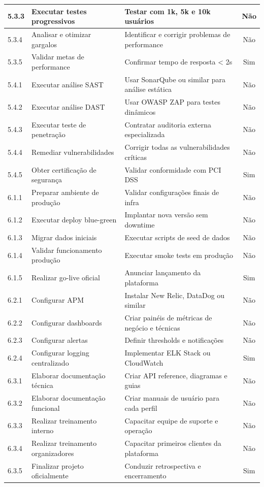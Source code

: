 \begin{table}[H]
\begin{tabular}{|p{0.9cm}|p{6.2cm}|p{5.7cm}|c|}
5.3.3 & Executar testes progressivos & Testar com 1k, 5k e 10k usuários & Não \\ \hline
5.3.4 & Analisar e otimizar gargalos & Identificar e corrigir problemas de performance & Não \\ \hline
5.3.5 & Validar metas de performance & Confirmar tempo de resposta < 2s & Sim \\ \hline
5.4.1 & Executar análise SAST & Usar SonarQube ou similar para análise estática & Não \\ \hline
5.4.2 & Executar análise DAST & Usar OWASP ZAP para testes dinâmicos & Não \\ \hline
5.4.3 & Executar teste de penetração & Contratar auditoria externa especializada & Não \\ \hline
5.4.4 & Remediar vulnerabilidades & Corrigir todas as vulnerabilidades críticas & Não \\ \hline
5.4.5 & Obter certificação de segurança & Validar conformidade com PCI DSS & Sim \\ \hline
6.1.1 & Preparar ambiente de produção & Validar configurações finais de infra & Não \\ \hline
6.1.2 & Executar deploy blue-green & Implantar nova versão sem downtime & Não \\ \hline
6.1.3 & Migrar dados iniciais & Executar scripts de seed de dados & Não \\ \hline
6.1.4 & Validar funcionamento produção & Executar smoke tests em produção & Não \\ \hline
6.1.5 & Realizar go-live oficial & Anunciar lançamento da plataforma & Sim \\ \hline
6.2.1 & Configurar APM & Instalar New Relic, DataDog ou similar & Não \\ \hline
6.2.2 & Configurar dashboards & Criar painéis de métricas de negócio e técnicas & Não \\ \hline
6.2.3 & Configurar alertas & Definir thresholds e notificações & Não \\ \hline
6.2.4 & Configurar logging centralizado & Implementar ELK Stack ou CloudWatch & Sim \\ \hline
6.3.1 & Elaborar documentação técnica & Criar API reference, diagramas e guias & Não \\ \hline
6.3.2 & Elaborar documentação funcional & Criar manuais de usuário para cada perfil & Não \\ \hline
6.3.3 & Realizar treinamento interno & Capacitar equipe de suporte e operação & Não \\ \hline
6.3.4 & Realizar treinamento organizadores & Capacitar primeiros clientes da plataforma & Não \\ \hline
6.3.5 & Finalizar projeto oficialmente & Conduzir retrospectiva e encerramento & Sim \\ \hline
\end{tabular}
\end{table}

